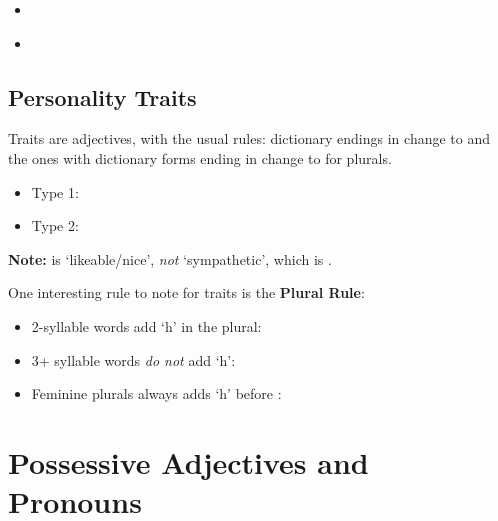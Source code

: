 \begin{itemize}
    \item {} \\

    \item {} \\
\end{itemize}


\section{Personality Traits}
Traits are adjectives, with the usual rules: dictionary endings in  change to  and
the ones with dictionary forms ending in  change to  for plurals.

\begin{itemize}[nosep]
    \item Type 1: 
    \item Type 2: 
\end{itemize}


\textbf{Note:}  is `likeable/nice', \textit{not} `sympathetic', which is .


One interesting rule to note for traits is the \textbf{ Plural Rule}:

\begin{itemize}[nosep]
    \item 2-syllable  words add `h' in the plural: 
    \item 3+ syllable  words \textit{do not} add `h': 
    \item Feminine plurals always adds `h' before : 
\end{itemize}

\chapter{Possessive Adjectives and Pronouns}

